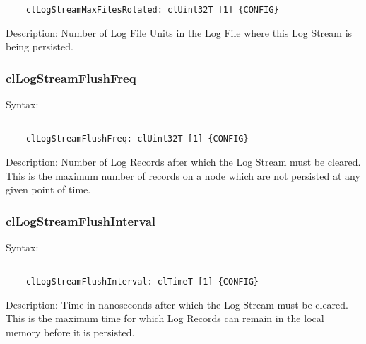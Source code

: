 \begin{flushleft}
\begin{Desc}
\begin{verbatim}
	clLogStreamMaxFilesRotated: clUint32T [1] {CONFIG}
	\end{verbatim}
	\normalsize
\end{Desc}

\begin{Desc}
 \item[Description:]
Number of Log File Units in the Log File where this Log Stream is being persisted.
\end{Desc}



\subsubsection{clLogStreamFlushFreq}
\begin{Desc}
\item[Syntax:]
\footnotesize\begin{verbatim}        	

	clLogStreamFlushFreq: clUint32T [1] {CONFIG}
	\end{verbatim}
	\normalsize
\end{Desc}

\begin{Desc}
 \item[Description:]
Number of Log Records after which the Log Stream must be cleared. This is the maximum number of records on a node which are not persisted at any 
given point of time.
\end{Desc}


\subsubsection{clLogStreamFlushInterval}
\begin{Desc}
\item[Syntax:]
\footnotesize\begin{verbatim}        	

	clLogStreamFlushInterval: clTimeT [1] {CONFIG}
	\end{verbatim}
	\normalsize
\end{Desc}

\begin{Desc}
 \item[Description:]
Time in nanoseconds after which the Log Stream must be cleared. This is the maximum time for which Log Records can remain in the local memory before
it is persisted.
\end{Desc}



\end{flushleft}
